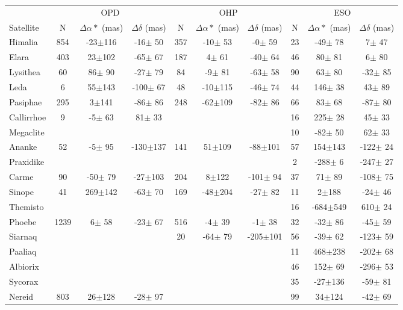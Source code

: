 \documentclass[11pt,a4paper]{report}
\author{Altair Ramos}
\begin{document}
\begin{landscape}

\begin{table*}
\begin{centering}
\begin{tabular}{l|ccc|ccc|ccc}
\hline  \hline
 & \multicolumn{3}{|c|}{OPD} & \multicolumn{3}{|c|}{OHP} & \multicolumn{3}{|c}{ESO}\tabularnewline
Satellite  & N & $\Delta\alpha*$ (mas) & $\Delta\delta$ (mas) & N & $\Delta\alpha*$ (mas) & $\Delta\delta$ (mas) & N & $\Delta\alpha*$ (mas) & $\Delta\delta$ (mas) \tabularnewline
\hline
Himalia  & 854 & -23$\pm$116 & -16$\pm$ 50 & 357 & -10$\pm$ 53 &  -0$\pm$ 59 & 23 & -49$\pm$ 78 &   7$\pm$ 47 \tabularnewline
Elara  & 403 &  23$\pm$102 & -65$\pm$ 67 & 187 &   4$\pm$ 61 & -40$\pm$ 64 & 46 &  80$\pm$ 81 &   6$\pm$ 80 \tabularnewline
Lysithea & 60 &  86$\pm$ 90 & -27$\pm$ 79 & 84 &  -9$\pm$ 81 & -63$\pm$ 58 & 90 &  63$\pm$ 80 & -32$\pm$ 85 \tabularnewline
Leda  & 6 &  55$\pm$143 & -100$\pm$ 67 & 48 & -10$\pm$115 & -46$\pm$ 74 & 44 & 146$\pm$ 38 &  43$\pm$ 89 \tabularnewline
\hdashline
Pasiphae  & 295 &   3$\pm$141 & -86$\pm$ 86 & 248 & -62$\pm$109 & -82$\pm$ 86 & 66 &  83$\pm$ 68 & -87$\pm$ 80 \tabularnewline
Callirrhoe & 9 &  -5$\pm$ 63 &  81$\pm$ 33 & & &  & 16 & 225$\pm$ 28 &  45$\pm$ 33\tabularnewline
Megaclite & & &  & & &  & 10 & -82$\pm$ 50 &  62$\pm$ 33\tabularnewline
\hdashline
Ananke  & 52 &  -5$\pm$ 95 & -130$\pm$137 & 141 &  51$\pm$109 & -88$\pm$101  & 57 & 154$\pm$143 & -122$\pm$ 24 \tabularnewline
Praxidike & & &  & & &  & 2 & -288$\pm$  6 & -247$\pm$ 27\tabularnewline
\hdashline
Carme  & 90 & -50$\pm$ 79 & -27$\pm$103 &  204 &   8$\pm$122 & -101$\pm$ 94 & 37 &  71$\pm$ 89 & -108$\pm$ 75 \tabularnewline
\hdashline
Sinope  & 41 & 269$\pm$142 & -63$\pm$ 70 & 169 & -48$\pm$204 & -27$\pm$ 82 & 11 &   2$\pm$188 & -24$\pm$ 46\tabularnewline
\hdashline
Themisto & & &  & & &  & 16 & -684$\pm$549 & 610$\pm$ 24 \tabularnewline
\hline
Phoebe & 1239 &   6$\pm$ 58 & -23$\pm$ 67 & 516 &  -4$\pm$ 39 &  -1$\pm$ 38 & 32 & -32$\pm$ 86 & -45$\pm$ 59 \tabularnewline
\hdashline
Siarnaq & & &  & 20 & -64$\pm$ 79 & -205$\pm$101 & 56 & -39$\pm$ 62 & -123$\pm$ 59 \tabularnewline
Paaliaq & & &  & & &  & 11 & 468$\pm$238 & -202$\pm$ 68 \tabularnewline
\hdashline
Albiorix  & & &  & & &  & 46 & 152$\pm$ 69 & -296$\pm$ 53 \tabularnewline
\hline
Sycorax & & &  & & &  & 35 & -27$\pm$136 & -59$\pm$ 81 \tabularnewline
\hline
Nereid & 803 &  26$\pm$128 & -28$\pm$ 97 & & &  & 99 &  34$\pm$124 & -42$\pm$ 69 \tabularnewline
\hline
\end{tabular}
\par \end{centering}
\end{table*}


\end{landscape}
\end{document}
